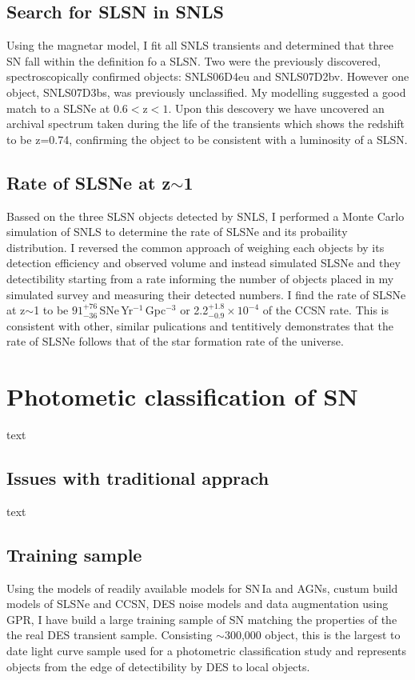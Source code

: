 \subsection{Search for SLSN in SNLS}
Using the magnetar model, I fit all SNLS transients and determined that three SN fall within the definition fo a SLSN. Two were the previously discovered, spectroscopically confirmed objects: SNLS06D4eu and SNLS07D2bv. However one object, SNLS07D3bs, was previously unclassified. My modelling suggested a good match to a SLSNe at 0.6$<$z$<1$. Upon this descovery we have uncovered an archival spectrum taken during the life of the transients which shows the redshift to be z=0.74, confirming the object to be consistent with a luminosity of a SLSN.

\subsection{Rate of SLSNe at z$\sim$1}
Bassed on the three SLSN objects detected by SNLS, I performed a Monte Carlo simulation of SNLS to determine the rate of SLSNe and its probaility distribution. I reversed the common approach of weighing each objects by its detection efficiency and observed volume and instead simulated SLSNe and they detectibility starting from a rate informing the number of objects placed in my simulated survey and measuring their detected numbers. I find the rate of SLSNe at z$\sim$1 to be $91^{+76}_{-36}$\,SNe\,Yr$^{-1}$\,Gpc$^{-3}$ or 2.2$^{+1.8}_{-0.9}\times10^{-4}$ of the CCSN rate. This is consistent with other, similar pulications and tentitively demonstrates that the rate of SLSNe follows that of the star formation rate of the universe.

\section{Photometic classification of SN}
text

\subsection{Issues with traditional apprach}
text

\subsection{Training sample}
Using the models of readily available models for SN\,Ia and AGNs, custum build models of SLSNe and CCSN, DES noise models and data augmentation using GPR, I have build a large training sample of SN matching the properties of the the real DES transient sample. Consisting $\sim$300,000 object, this is the largest to date light curve sample used for a photometric classification study and represents objects from the edge of detectibility by DES to local objects.

